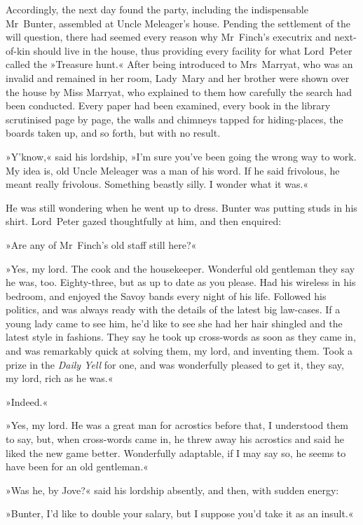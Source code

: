 \divider
Accordingly, the next day found the party, including the indispensable Mr~Bunter, assembled at Uncle Meleager's house. Pending the settlement of the will question, there had seemed every reason why Mr~Finch's executrix and next-of-kin should live in the house, thus providing every facility for what Lord~Peter called the »Treasure hunt.« After being introduced to Mrs~Marryat, who was an invalid and remained in her room, Lady~Mary and her brother were shown over the house by Miss Marryat, who explained to them how carefully the search had been conducted. Every paper had been examined, every book in the library scrutinised page by page, the walls and chimneys tapped for hiding-places, the boards taken up, and so forth, but with no result.

»Y'know,« said his lordship, »I'm sure you've been going the wrong way to work. My idea is, old Uncle Meleager was a man of his word. If he said frivolous, he meant really frivolous. Something beastly silly. I wonder what it was.«

He was still wondering when he went up to dress. Bunter was putting studs in his shirt. Lord~Peter gazed thoughtfully at him, and then enquired:

»Are any of Mr~Finch's old staff still here?«

»Yes, my lord. The cook and the housekeeper. Wonderful old gentleman they say he was, too. Eighty-three, but as up to date as you please. Had his wireless in his bedroom, and enjoyed the Savoy bands every night of his life. Followed his politics, and was always ready with the details of the latest big law-cases. If a young lady came to see him, he'd like to see she had her hair shingled and the latest style in fashions. They say he took up cross-words as soon as they came in, and was remarkably quick at solving them, my lord, and inventing them. Took a  prize in the \textit{Daily Yell} for one, and was wonderfully pleased to get it, they say, my lord, rich as he was.«

»Indeed.«

»Yes, my lord. He was a great man for acrostics before that, I understood them to say, but, when cross-words came in, he threw away his acrostics and said he liked the new game better. Wonderfully adaptable, if I may say so, he seems to have been for an old gentleman.«

»Was he, by Jove?« said his lordship absently, and then, with sudden energy:

»Bunter, I'd like to double your salary, but I suppose you'd take it as an insult.«

